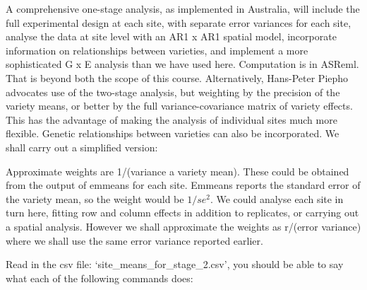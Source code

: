 \documentclass[
]{book}
\newenvironment{Shaded}{\begin{snugshade}}{\end{snugshade}}
\newcommand{\AttributeTok}[1]{\textcolor[rgb]{0.77,0.63,0.00}{#1}}
\newcommand{\CommentTok}[1]{\textcolor[rgb]{0.56,0.35,0.01}{\textit{#1}}}
\newcommand{\DecValTok}[1]{\textcolor[rgb]{0.00,0.00,0.81}{#1}}
\newcommand{\FloatTok}[1]{\textcolor[rgb]{0.00,0.00,0.81}{#1}}
\newcommand{\FunctionTok}[1]{\textcolor[rgb]{0.00,0.00,0.00}{#1}}
\newcommand{\NormalTok}[1]{#1}
\newcommand{\OtherTok}[1]{\textcolor[rgb]{0.56,0.35,0.01}{#1}}
\newcommand{\SpecialCharTok}[1]{\textcolor[rgb]{0.00,0.00,0.00}{#1}}
\newcommand{\StringTok}[1]{\textcolor[rgb]{0.31,0.60,0.02}{#1}}
\begin{document}
A comprehensive one-stage analysis, as implemented in Australia, will include the full experimental design at each site, with separate error variances for each site, analyse the data at site level with an AR1 x AR1 spatial model, incorporate information on relationships between varieties, and implement a more sophisticated G x E analysis than we have used here. Computation is in ASReml. That is beyond both the scope of this course. Alternatively, Hans-Peter Piepho advocates use of the two-stage analysis, but weighting by the precision of the variety means, or better by the full variance-covariance matrix of variety effects. This has the advantage of making the analysis of individual sites much more flexible. Genetic relationships between varieties can also be incorporated. We shall carry out a simplified version:

Approximate weights are 1/(variance a variety mean). These could be obtained from the output of emmeans for each site. Emmeans reports the standard error of the variety mean, so the weight would be \(1/se^2\). We could analyse each site in turn here, fitting row and column effects in addition to replicates, or carrying out a spatial analysis. However we shall approximate the weights as r/(error variance) where we shall use the same error variance reported earlier.

Read in the csv file: `site\_means\_for\_stage\_2.csv', you should be able to say what each of the following commands does:

\begin{Shaded}
\end{Shaded}
\end{document}
